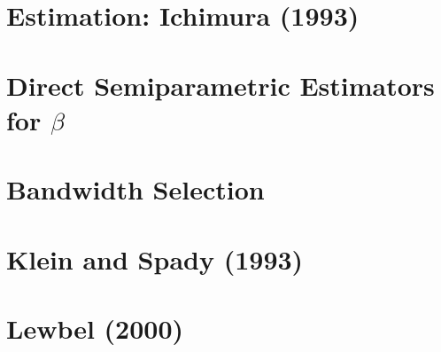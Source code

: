 \documentclass[xcolor=svgnames,dvipdfmx,cjk]{beamer}
\theoremstyle{example}
\begin{document}
\section{Estimation: Ichimura (1993)}
\begin{frame}
  \tableofcontents[currentsection]
\end{frame}









\section{Direct Semiparametric Estimators for $\beta$}
\begin{frame}
  \tableofcontents[currentsection]
\end{frame}









\section{Bandwidth Selection}
\begin{frame}
  \tableofcontents[currentsection]
\end{frame}









\section{Klein and Spady (1993)}
\begin{frame}
  \tableofcontents[currentsection]
\end{frame}









\section{Lewbel (2000)}
\begin{frame}
  \tableofcontents[currentsection]
\end{frame}
\end{document}
